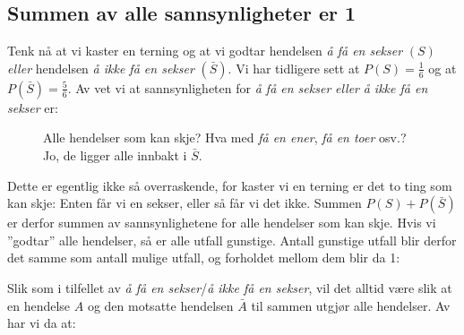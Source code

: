 \subsection{Summen av alle sannsynligheter er 1}
Tenk nå at vi kaster en terning og at vi godtar hendelsen \textit{å få en sekser} $ (S) $ \textsl{eller} hendelsen \textit{å ikke få en sekser} $ (\bar{S}) $. Vi har tidligere sett at $ {P(S)=\frac{1}{6}} $ og at $ {P(\bar{S})=\frac{5}{6} }$. Av  vet vi at sannsynligheten for \textit{å få en sekser} \textsl{eller} \textit{å ikke få en sekser} er:
\begin{figure}
	\vs\vs
	\begin{shaded}
		Alle hendelser som kan skje? Hva med \textit{få en ener}, \textit{få en toer} osv.? Jo, de ligger alle innbakt i $ \bar{S} $.
	\end{shaded}
\end{figure}
Dette er egentlig ikke så overraskende, for kaster vi en terning er det to ting som kan skje: Enten får vi en sekser, eller så får vi det ikke. Summen $ P(S)+P(\bar{S}) $ er derfor summen av sannsynlighetene for alle hendelser som kan skje. Hvis vi ''godtar'' alle hendelser, så er alle utfall gunstige. Antall gunstige utfall blir derfor det samme som antall mulige utfall, og forholdet mellom dem blir da 1: 

Slik som i tilfellet av \textit{å få en sekser}/\textit{å ikke få en sekser}, vil det alltid være slik at en hendelse $ A $ og den motsatte hendelsen $ \bar A $ til sammen utgjør alle hendelser. Av  har vi da at:
